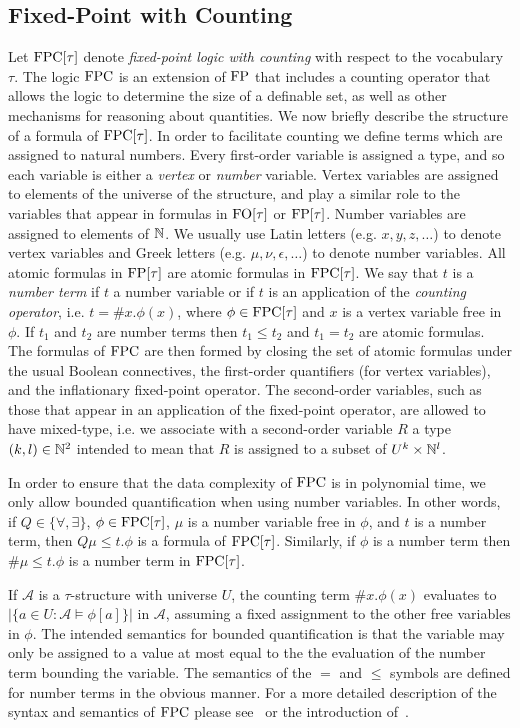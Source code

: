 \documentclass[../paper.tex]{subfiles}
\begin{document}
\subsection{Fixed-Point with Counting}
Let $\text{\upshape FPC}[\tau]$ denote \emph{fixed-point logic with counting} with respect to
the vocabulary $\tau$. The logic $\text{\upshape FPC}$ is an extension of $\text{\upshape FP}$ that includes a
counting operator that allows the logic to determine the size of a definable
set, as well as other mechanisms for reasoning about quantities. We now briefly
describe the structure of a formula of $\text{\upshape FPC}[\tau]$. In order to facilitate
counting we define terms which are assigned to natural numbers. Every
first-order variable is assigned a type, and so each variable is either a
\emph{vertex} or \emph{number} variable. Vertex variables are assigned to
elements of the universe of the structure, and play a similar role to the
variables that appear in formulas in $\text{\upshape FO}[\tau]$ or $\text{\upshape FP}[\tau]$. Number
variables are assigned to elements of $\mathbb{N}$. We usually use Latin letters
(e.g. $x, y, z, \ldots$) to denote vertex variables and Greek letters (e.g.
$\mu, \nu, \epsilon, \ldots$) to denote number variables. All atomic formulas in
$\text{\upshape FP}[\tau]$ are atomic formulas in $\text{\upshape FPC}[\tau]$. We say that $t$ is a
\emph{number term} if $t$ a number variable or if $t$ is an application of the
\emph{counting operator}, i.e. $t = \#x. \phi(x)$, where $\phi \in \text{\upshape FPC}[\tau]$
and $x$ is a vertex variable free in $\phi$. If $t_1$ and $t_2$ are number terms
then $t_1 \leq t_2$ and $t_1 = t_2$ are atomic formulas. The formulas of $\text{\upshape FPC}$
are then formed by closing the set of atomic formulas under the usual Boolean
connectives, the first-order quantifiers (for vertex variables), and the
inflationary fixed-point operator. The second-order variables, such as those
that appear in an application of the fixed-point operator, are allowed to have
mixed-type, i.e. we associate with a second-order variable $R$ a type $(k, l)
\in \mathbb{N}^2$ intended to mean that $R$ is assigned to a subset of $U^k \times
\mathbb{N}^l$.

In order to ensure that the data complexity of $\text{\upshape FPC}$ is in polynomial time, we
only allow bounded quantification when using number variables. In other words,
if $Q \in \{\forall, \exists \}$, $\phi \in \text{\upshape FPC}[\tau]$, $\mu$ is a number
variable free in $\phi$, and $t$ is a number term, then $Q \mu \leq t . \phi$ is
a formula of $\text{\upshape FPC}[\tau]$. Similarly, if $\phi$ is a number term then $\# \mu
\leq t .\phi$ is a number term in $\text{\upshape FPC}[\tau]$.

If $\mathcal{A}$ is a $\tau$-structure with universe $U$, the counting term
$\#x. \phi(x)$ evaluates to $\vert \{a \in U : \mathcal{A} \models \phi[a]\}
\vert$ in $\mathcal{A}$, assuming a fixed assignment to the other free variables
in $\phi$. The intended semantics for bounded quantification is that the
variable may only be assigned to a value at most equal to the the evaluation of
the number term bounding the variable. The semantics of the $=$ and $\leq$
symbols are defined for number terms in the obvious manner. For a more detailed
description of the syntax and semantics of $\text{\upshape FPC}$ please
see~\cite{grohe2017descriptive} or the introduction of~\cite{GradelP15a}.
\end{document}
